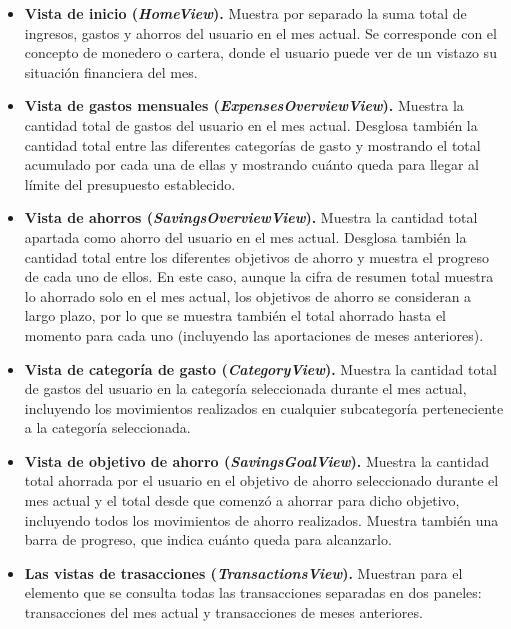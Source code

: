 \begin{itemize}
    \item \textbf{Vista de inicio (\textit{HomeView}).} Muestra por separado la suma total de ingresos, gastos y ahorros del usuario en el mes actual. Se corresponde con el concepto de monedero o cartera, donde el usuario puede ver de un vistazo su situación financiera del mes.
    \item \textbf{Vista de gastos mensuales (\textit{ExpensesOverviewView}).} Muestra la cantidad total de gastos del usuario en el mes actual. Desglosa también la cantidad total entre las diferentes categorías de gasto y mostrando el total acumulado por cada una de ellas y mostrando cuánto queda para llegar al límite del presupuesto establecido.
    \item \textbf{Vista de ahorros (\textit{SavingsOverviewView}).} Muestra la cantidad total apartada como ahorro del usuario en el mes actual. Desglosa también la cantidad total entre los diferentes objetivos de ahorro y muestra el progreso de cada uno de ellos. En este caso, aunque la cifra de resumen total muestra lo ahorrado solo en el mes actual, los objetivos de ahorro se consideran a largo plazo, por lo que se muestra también el total ahorrado hasta el momento para cada uno (incluyendo las aportaciones de meses anteriores).
    \item \textbf{Vista de categoría de gasto (\textit{CategoryView}).} Muestra la cantidad total de gastos del usuario en la categoría seleccionada durante el mes actual, incluyendo los movimientos realizados en cualquier subcategoría perteneciente a la categoría seleccionada.
    \item \textbf{Vista de objetivo de ahorro (\textit{SavingsGoalView}).} Muestra la cantidad total ahorrada por el usuario en el objetivo de ahorro seleccionado durante el mes actual y el total desde que comenzó a ahorrar para dicho objetivo, incluyendo todos los movimientos de ahorro realizados. Muestra también una barra de progreso, que indica cuánto queda para alcanzarlo. 
    \item \textbf{Las vistas de trasacciones (\textit{TransactionsView}).} Muestran para el elemento que se consulta todas las transacciones separadas en dos paneles: transacciones del mes actual y transacciones de meses anteriores.
\end{itemize}

